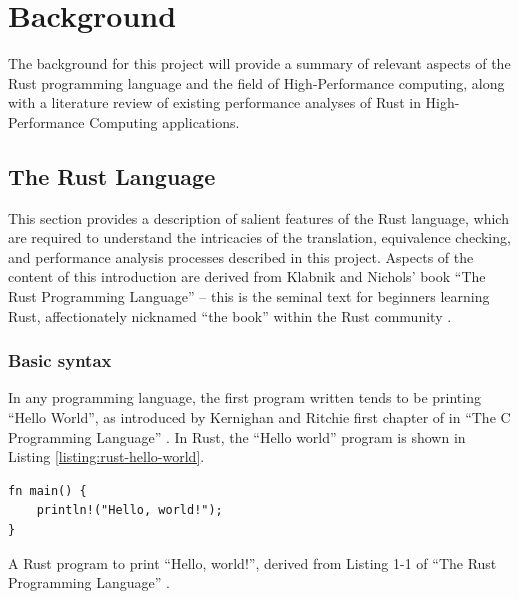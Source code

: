 \chapter{Background}
\label{ch:background}


The background for this project will provide a summary of relevant aspects of the Rust programming language and the field of High-Performance computing, along with a literature review of existing performance analyses of Rust in High-Performance Computing applications.




\section{The Rust Language}
\label{sec:rust} %

This section provides a description of salient features of the Rust language, which are required to understand the intricacies of the translation, equivalence checking, and performance analysis processes described in this project. Aspects of the content of this introduction are derived from Klabnik and Nichols' book ``The Rust Programming Language'' \cite{RustProgrammingLanguage} -- this is the seminal text for beginners learning Rust, affectionately nicknamed ``the book'' within the Rust community \cite{LearnRust}.

\subsection{Basic syntax}
\label{ssec:rust-syntax}

In any programming language, the first program written tends to be printing ``Hello World'', as introduced by Kernighan and Ritchie first chapter of in ``The C Programming Language'' \cite{kernighan2002c}. In Rust, the ``Hello world'' program is shown in Listing \ref{listing:rust-hello-world}.

\begin{listing}[H]
    \begin{verbatim}
fn main() {
    println!("Hello, world!");
}
    \end{verbatim}
    \caption{A Rust program to print ``Hello, world!'', derived from Listing 1-1 of ``The Rust Programming Language'' \cite{RustProgrammingLanguage}.}
    \label{listing:rust-hello-world}
\end{listing}

